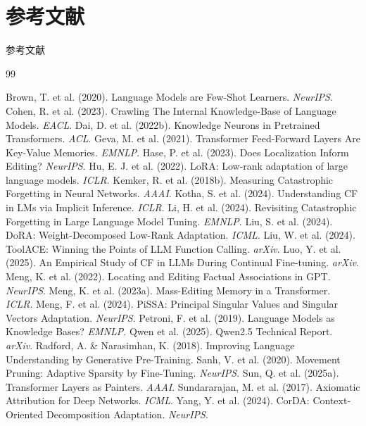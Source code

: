 \documentclass{beamer}
\begin{document}
    \section{参考文献}
    \begin{frame}[shrink=15]{参考文献}
        \tiny
        \setlength{\itemsep}{0pt}
        \setlength{\parskip}{0pt}
        \begin{thebibliography}{99}
        \setlength{\itemsep}{1pt}
        
        Brown, T. et al. (2020). Language Models are Few-Shot Learners. \textit{NeurIPS}.
        Cohen, R. et al. (2023). Crawling The Internal Knowledge-Base of Language Models. \textit{EACL}.
        Dai, D. et al. (2022b). Knowledge Neurons in Pretrained Transformers. \textit{ACL}.
        Geva, M. et al. (2021). Transformer Feed-Forward Layers Are Key-Value Memories. \textit{EMNLP}.
        Hase, P. et al. (2023). Does Localization Inform Editing? \textit{NeurIPS}.
        Hu, E. J. et al. (2022). LoRA: Low-rank adaptation of large language models. \textit{ICLR}.
        Kemker, R. et al. (2018b). Measuring Catastrophic Forgetting in Neural Networks. \textit{AAAI}.
        Kotha, S. et al. (2024). Understanding CF in LMs via Implicit Inference. \textit{ICLR}.
        Li, H. et al. (2024). Revisiting Catastrophic Forgetting in Large Language Model Tuning. \textit{EMNLP}.
        Liu, S. et al. (2024). DoRA: Weight-Decomposed Low-Rank Adaptation. \textit{ICML}.
        Liu, W. et al. (2024). ToolACE: Winning the Points of LLM Function Calling. \textit{arXiv}.
        Luo, Y. et al. (2025). An Empirical Study of CF in LLMs During Continual Fine-tuning. \textit{arXiv}.
        Meng, K. et al. (2022). Locating and Editing Factual Associations in GPT. \textit{NeurIPS}.
        Meng, K. et al. (2023a). Mass-Editing Memory in a Transformer. \textit{ICLR}.
        Meng, F. et al. (2024). PiSSA: Principal Singular Values and Singular Vectors Adaptation. \textit{NeurIPS}.
        Petroni, F. et al. (2019). Language Models as Knowledge Bases? \textit{EMNLP}.
        Qwen et al. (2025). Qwen2.5 Technical Report. \textit{arXiv}.
        Radford, A. \& Narasimhan, K. (2018). Improving Language Understanding by Generative Pre-Training.
        Sanh, V. et al. (2020). Movement Pruning: Adaptive Sparsity by Fine-Tuning. \textit{NeurIPS}.
        Sun, Q. et al. (2025a). Transformer Layers as Painters. \textit{AAAI}.
        Sundararajan, M. et al. (2017). Axiomatic Attribution for Deep Networks. \textit{ICML}.
        Yang, Y. et al. (2024). CorDA: Context-Oriented Decomposition Adaptation. \textit{NeurIPS}.


\end{thebibliography}
\end{frame}
\end{document}
